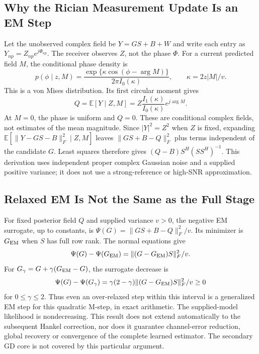 \documentclass[journal]{IEEEtran}
\begin{document}
\subsection{Why the Rician Measurement Update Is an EM Step}
Let the unobserved complex field be $Y=GS+B+W$ and write each entry as
$Y_{np}=Z_{np}e^{j\Phi_{np}}$. The receiver observes $Z$, not the phase
$\Phi$. For a current predicted field $M$, the conditional phase density is
\begin{equation}
 p(\phi\mid z,M)=\frac{\exp\{\kappa\cos(\phi-\arg M)\}}
 {2\pi I_0(\kappa)},\qquad \kappa=2z|M|/v.
\end{equation}
This is a von Mises distribution. Its first circular moment gives
\begin{equation}
 Q=\mathbb E[Y\mid Z,M]=Z\frac{I_1(\kappa)}{I_0(\kappa)}e^{j\arg M}.
\end{equation}
At $M=0$, the phase is uniform and $Q=0$. These are conditional complex
fields, not estimates of the mean magnitude. Since $|Y|^2=Z^2$ when $Z$
is fixed, expanding $\mathbb E[\|Y-GS-B\|_F^2\mid Z,M]$ leaves
$\|GS+B-Q\|_F^2$ plus terms independent of the candidate $G$.
Least squares therefore gives $(Q-B)S^H(SS^H)^{-1}$. This derivation uses
independent proper complex Gaussian noise and a supplied positive variance;
it does not use a strong-reference or high-SNR approximation.

\subsection{Relaxed EM Is Not the Same as the Full Stage}
For fixed posterior field $Q$ and supplied variance $v>0$, the negative
EM surrogate, up to constants, is
$\Psi(G)=\|GS+B-Q\|_F^2/v$. Its minimizer is $G_{\rm EM}$ when $S$
has full row rank. The normal equations give
\begin{equation}
 \Psi(G)-\Psi(G_{\rm EM})=\|(G-G_{\rm EM})S\|_F^2/v.
\end{equation}
For $G_\gamma=G+\gamma(G_{\rm EM}-G)$, the surrogate decrease is
\begin{equation}
 \Psi(G)-\Psi(G_\gamma)=\gamma(2-\gamma)
 \|(G-G_{\rm EM})S\|_F^2/v\ge0
\end{equation}
for $0\le\gamma\le2$. Thus even an over-relaxed step within this
interval is a generalized EM step for this quadratic M-step, in exact
arithmetic. The supplied-model likelihood is nondecreasing. This result
does not extend automatically to the subsequent Hankel correction, nor
does it guarantee channel-error reduction, global recovery or convergence
of the complete learned estimator. The secondary GD core is not covered
by this particular argument.
\end{document}
